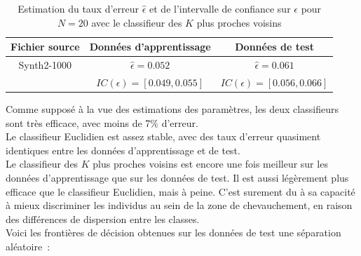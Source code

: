 \documentclass[a4paper,10pt]{report}
\begin{document}
\begin{table}[H]
	\centering
	\captionsetup{justification=centering, margin=4cm}
	\begin{tabular}{c|c|c}
		Fichier source & Données d'apprentissage & Données de test \\ 
		\hline
		\small Synth2-1000 & $ \hat{\epsilon} = 0.052 $  &  $ \hat{\epsilon} = 0.061 $ \\
		&  $ IC(\epsilon) = [ 0.049 , 0.055 ] $  & $ IC(\epsilon) = [ 0.056 , 0.066 ] $ \\ 
	\end{tabular}
	\caption{\small Estimation du taux d'erreur $\hat{\epsilon}$ et de l'intervalle de confiance sur $\epsilon$ pour $N = 20$ avec le classifieur des $K$ plus proches voisins}
	\label{table:1-2-error-rate-Synth2-N-20-kppv}
\end{table}



Comme supposé à la vue des estimations des paramètres, les deux classifieurs sont très efficace, avec moins de 7\% d'erreur.\\

Le classifieur Euclidien est assez stable, avec des taux d'erreur quasiment identiques entre les données d'apprentissage et de test.\\

Le classifieur des $K$ plus proches voisins est encore une fois meilleur sur les données d'apprentissage que sur les données de test. Il est aussi légèrement plus efficace que le classifieur Euclidien, mais à peine. C'est surement du à sa capacité à mieux discriminer les individus au sein de la zone de chevauchement, en raison des différences de dispersion entre les classes.\\

Voici les frontières de décision obtenues sur les données de test une séparation aléatoire~:
\end{document}
